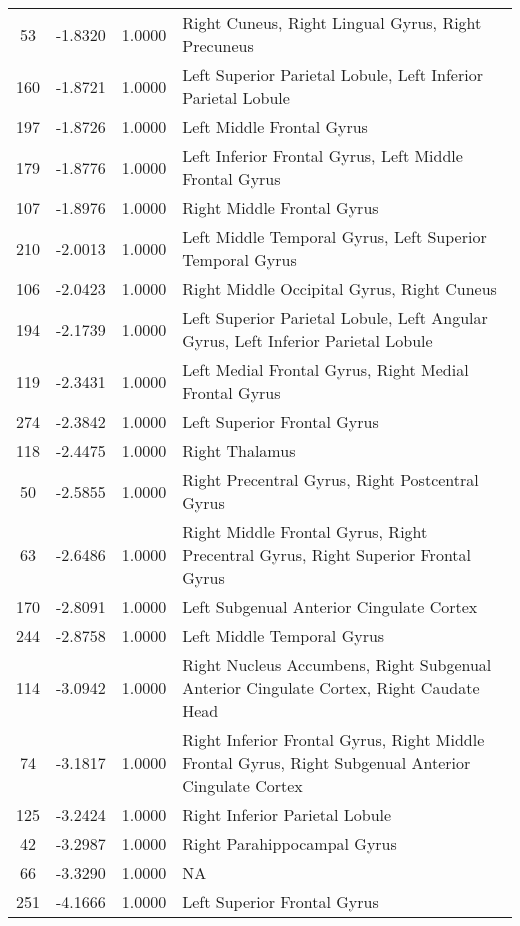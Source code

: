 \documentclass[10pt,letterpaper]{article}\usepackage[]{graphicx}\usepackage[]{color}
\begin{document}
\begin{center}
\begin{longtable}[c]{cccp{4in}}
		53	& -1.8320 & 1.0000 & Right Cuneus, Right Lingual Gyrus, Right Precuneus \\
		160	& -1.8721 & 1.0000 & Left Superior Parietal Lobule, Left Inferior Parietal Lobule \\
		197	& -1.8726 & 1.0000 & Left Middle Frontal Gyrus \\
		179	& -1.8776 & 1.0000 & Left Inferior Frontal Gyrus, Left Middle Frontal Gyrus \\
		107	& -1.8976 & 1.0000 & Right Middle Frontal Gyrus \\
		210	& -2.0013 & 1.0000 & Left Middle Temporal Gyrus, Left Superior Temporal Gyrus \\
		106	& -2.0423 & 1.0000 & Right Middle Occipital Gyrus, Right Cuneus \\
		194	& -2.1739 & 1.0000 & Left Superior Parietal Lobule, Left Angular Gyrus, Left Inferior Parietal Lobule \\
		119	& -2.3431 & 1.0000 & Left Medial Frontal Gyrus, Right Medial Frontal Gyrus \\
		274	& -2.3842 & 1.0000 & Left Superior Frontal Gyrus \\
		118	& -2.4475 & 1.0000 & Right Thalamus \\
		50	& -2.5855 & 1.0000 & Right Precentral Gyrus, Right Postcentral Gyrus \\
		63	& -2.6486 & 1.0000 & Right Middle Frontal Gyrus, Right Precentral Gyrus, Right Superior Frontal Gyrus \\
		170	& -2.8091 & 1.0000 & Left Subgenual Anterior Cingulate Cortex\\
		244	& -2.8758 & 1.0000 & Left Middle Temporal Gyrus \\
		114	& -3.0942 & 1.0000 & Right Nucleus Accumbens, Right Subgenual Anterior Cingulate Cortex, Right Caudate Head \\
		74	& -3.1817 & 1.0000 & Right Inferior Frontal Gyrus, Right Middle Frontal Gyrus, Right Subgenual Anterior Cingulate Cortex \\
		125	& -3.2424 & 1.0000 & Right Inferior Parietal Lobule \\
		42	& -3.2987 & 1.0000 & Right Parahippocampal Gyrus \\
		66	& -3.3290 & 1.0000 & NA \\
		251	& -4.1666 & 1.0000 & Left Superior Frontal Gyrus \\
	\end{longtable}
\end{center}
\end{document}

